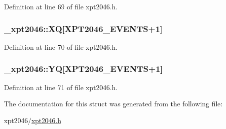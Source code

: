 Definition at line 69 of file xpt2046.\+h.

\subsubsection[{\texorpdfstring{XQ}{XQ}}]{ \+\_\+xpt2046\+::\+XQ\mbox{[}{\bf X\+P\+T2046\+\_\+\+E\+V\+E\+N\+TS}+1\mbox{]}}\hypertarget{struct__xpt2046_ac3f7953dda5a05a52276892bee461a29}{}\label{struct__xpt2046_ac3f7953dda5a05a52276892bee461a29}


Definition at line 70 of file xpt2046.\+h.

\subsubsection[{\texorpdfstring{YQ}{YQ}}]{ \+\_\+xpt2046\+::\+YQ\mbox{[}{\bf X\+P\+T2046\+\_\+\+E\+V\+E\+N\+TS}+1\mbox{]}}\hypertarget{struct__xpt2046_a0a1b0401066322d653135eb8db55d198}{}\label{struct__xpt2046_a0a1b0401066322d653135eb8db55d198}


Definition at line 71 of file xpt2046.\+h.



The documentation for this struct was generated from the following file\+:\begin{DoxyCompactItemize}
\item 
xpt2046/\hyperlink{xpt2046_8h}{xpt2046.\+h}\end{DoxyCompactItemize}
